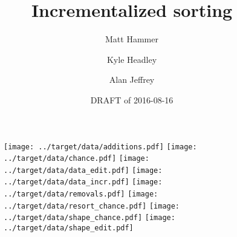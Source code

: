 \documentclass{article}
\title{Incrementalized sorting}
\author{Matt Hammer\and Kyle Headley\and Alan Jeffrey}
\date{DRAFT of 2016-08-16}
\begin{document}
\maketitle

\begin{figure}
  \centering
  \texttt{[image: ../target/data/additions.pdf]}
  \texttt{[image: ../target/data/chance.pdf]}
  \texttt{[image: ../target/data/data\_edit.pdf]}
  \texttt{[image: ../target/data/data\_incr.pdf]}
  \texttt{[image: ../target/data/removals.pdf]}
  \texttt{[image: ../target/data/resort\_chance.pdf]}
  \texttt{[image: ../target/data/shape\_chance.pdf]}
  \texttt{[image: ../target/data/shape\_edit.pdf]}
\end{figure}

\cite{servo}



\end{document}
